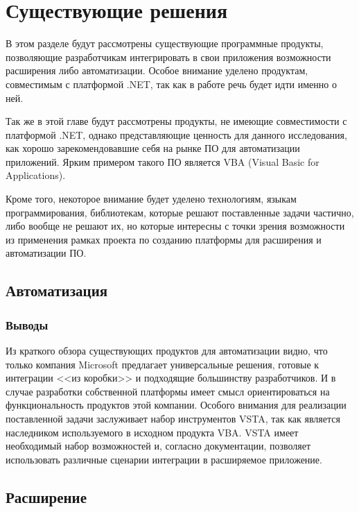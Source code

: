 \section{Существующие решения}

В этом разделе будут рассмотрены существующие программные продукты, позволяющие разработчикам интегрировать в свои приложения возможности расширения либо автоматизации. Особое внимание уделено продуктам, совместимым с платформой .NET, так как в работе речь будет идти именно о ней.

Так же в этой главе будут рассмотрены продукты, не имеющие совместимости с платформой .NET, однако представляющие ценность для данного исследования, как хорошо зарекомендовавшие себя на рынке ПО для автоматизации приложений. Ярким примером такого ПО является VBA (Visual Basic for Applications).

Кроме того, некоторое внимание будет уделено технологиям, языкам программирования, библиотекам, которые решают поставленные задачи частично, либо вообще не решают их, но которые интересны с точки зрения возможности из применения рамках проекта по созданию платформы для расширения и автоматизации ПО.

\subsection{Автоматизация}







\subsubsection{Выводы}

Из краткого обзора существующих продуктов для автоматизации видно, что только компания Microsoft предлагает универсальные решения, готовые к интеграции <<из коробки>> и подходящие большинству разработчиков. И в случае разработки собственной платформы имеет смысл ориентироваться на функциональность продуктов этой компании. Особого внимания для реализации поставленной задачи заслуживает набор инструментов VSTA, так как является наследником используемого в исходном продукта VBA. VSTA имеет необходимый набор возможностей и, согласно документации, позволяет использовать различные сценарии интеграции в расширяемое приложение.

\subsection{Расширение}

